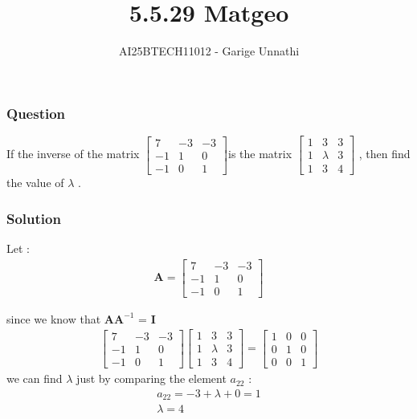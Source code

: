 \documentclass{beamer}
\title{5.5.29 Matgeo}
\author{AI25BTECH11012 - Garige Unnathi}
\date{}
\begin{document}
\frame{\titlepage}

\begin{frame}
\frametitle{Question}
If the inverse of the matrix  $\begin{bmatrix}7 &-3&-3\\
                                    -1&1&0\\
                                     -1&0&1\end{bmatrix}$is the matrix  $\begin{bmatrix}1&3&3\\1&\lambda&3\\1&3&4\end{bmatrix}$ , then find the value of $\lambda$ .
\end{frame}


\begin{frame}
\frametitle{Solution}
   
Let : 
\begin{align*}
    \textbf{A}  = \begin{bmatrix}7 &-3&-3\\
                      -1&1&0\\
                      -1&0&1\end{bmatrix}
\end{align*}

since we know that \textbf{A}$\textbf{A}^{-1}$ = \textbf{I}
\begin{align}
\begin{bmatrix}7&-3&-3\\-1&1&0\\-1&0&1\end{bmatrix}\begin{bmatrix}1&3&3\\1&\lambda&3\\1&3&4\end{bmatrix} = \begin{bmatrix}1&0&0\\0&1&0\\0&0&1\end{bmatrix}
\end{align}
we can find $\lambda$ just by comparing the  element $a_{22}$ :
\begin{align}
 a_{22} = -3 + \lambda + 0  = 1\\
 \lambda = 4
\end{align}

\end{frame}
\end{document}
